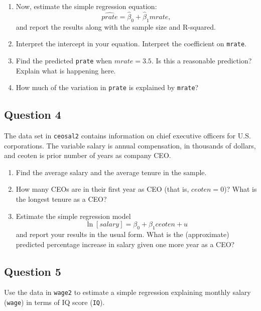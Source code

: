 \documentclass[]{article}
\providecommand{\tightlist}{%
  \setlength{\itemsep}{0pt}\setlength{\parskip}{0pt}}
\begin{document}
\begin{enumerate}
\def\labelenumi{\arabic{enumi}.}
\setcounter{enumi}{1}
\item
  Now, estimate the simple regression equation:
  \[\hat{prate} = \hat{\beta}_0+\hat{\beta}_1 mrate,\] and report the
  results along with the sample size and R-squared.
\item
  Interpret the intercept in your equation. Interpret the coefficient on
  \texttt{mrate}.
\item
  Find the predicted \texttt{prate} when \(mrate=3.5\). Is this a
  reasonable prediction? Explain what is happening here.
\item
  How much of the variation in \texttt{prate} is explained by
  \texttt{mrate}?
\end{enumerate}

\subsection{Question 4}\label{question-4}

The data set in \texttt{ceosal2} contains information on chief executive
officers for U.S. corporations. The variable salary is annual
compensation, in thousands of dollars, and ceoten is prior number of
years as company CEO.

\begin{enumerate}
\def\labelenumi{\arabic{enumi}.}
\tightlist
\item
  Find the average salary and the average tenure in the sample.
\item
  How many CEOs are in their first year as CEO (that is, \(ceoten=0\))?
  What is the longest tenure as a CEO?
\item
  Estimate the simple regression model
  \[\ln[salary]=\beta_0+\beta_1 ceoten+u\] and report your results in
  the usual form. What is the (approximate) predicted percentage
  increase in salary given one more year as a CEO?
\end{enumerate}

\subsection{Question 5}\label{question-5}

Use the data in \texttt{wage2} to estimate a simple regression
explaining monthly salary (\texttt{wage}) in terms of IQ score
(\texttt{IQ}).
\end{document}
